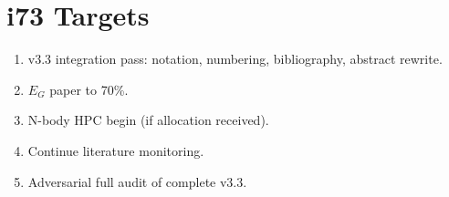 \documentclass[11pt,a4paper]{article}
\begin{document}
\section{i73 Targets}

\begin{enumerate}[nosep]
\item v3.3 integration pass: notation, numbering, bibliography, abstract rewrite.
\item $E_G$ paper to 70\%.
\item N-body HPC begin (if allocation received).
\item Continue literature monitoring.
\item Adversarial full audit of complete v3.3.
\end{enumerate}
\end{document}
